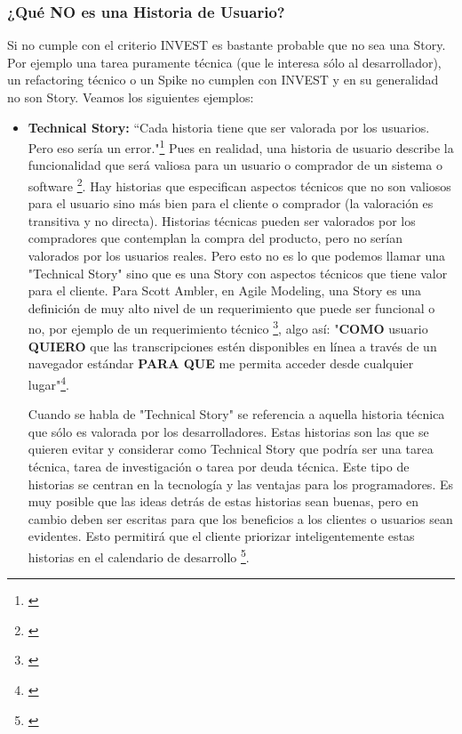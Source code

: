 \subsubsection{¿Qué NO es una Historia de Usuario?}

Si no cumple con el criterio INVEST es bastante probable que no sea una Story. Por ejemplo una tarea puramente técnica (que le interesa sólo al desarrollador), un refactoring técnico o un Spike no cumplen con INVEST y en su generalidad no son Story. 
Veamos los siguientes ejemplos:

\begin{itemize}

\item \textbf{Technical Story:}
“Cada historia tiene que ser valorada por los usuarios. Pero eso sería un error."\footnote{\cite{Cohn-2004}} Pues en realidad, una historia de usuario describe la funcionalidad que será valiosa para un usuario o comprador de un sistema o software \footnote{\cite{Cohn-2004}}. Hay historias que especifican aspectos técnicos que no son valiosos para el usuario sino más bien para el cliente o comprador (la valoración es transitiva y no directa). Historias técnicas pueden ser valorados por los compradores que contemplan la compra del producto, pero no serían valorados por los usuarios reales. Pero esto no es lo que podemos llamar una "Technical Story" sino que es una Story con aspectos técnicos que tiene valor para el cliente. Para Scott Ambler, en Agile Modeling, una Story es una definición de muy alto nivel de un requerimiento que puede ser funcional o no, por ejemplo de un requerimiento técnico \footnote{\cite{Scott-Ambler-2015}}, algo así: "\textbf{COMO} usuario \textbf{QUIERO} que las transcripciones estén disponibles en línea a través de un navegador estándar \textbf{PARA QUE} me permita acceder desde cualquier lugar"\footnote{\cite{Scott-Ambler-2015}}.

Cuando se habla de "Technical Story" se referencia a aquella historia técnica que sólo es valorada por los desarrolladores. Estas historias son las que se quieren evitar y considerar como Technical Story que podría ser una tarea técnica, tarea de investigación o tarea por deuda técnica. Este tipo de historias se centran en la tecnología y las ventajas para los programadores. Es muy posible que las ideas detrás de estas historias sean buenas, pero en cambio deben ser escritas para que los beneficios a los clientes o usuarios sean evidentes. Esto permitirá que el cliente priorizar inteligentemente estas historias en el calendario de desarrollo \footnote{\cite{Cohn-2004}}.


\end{itemize}
